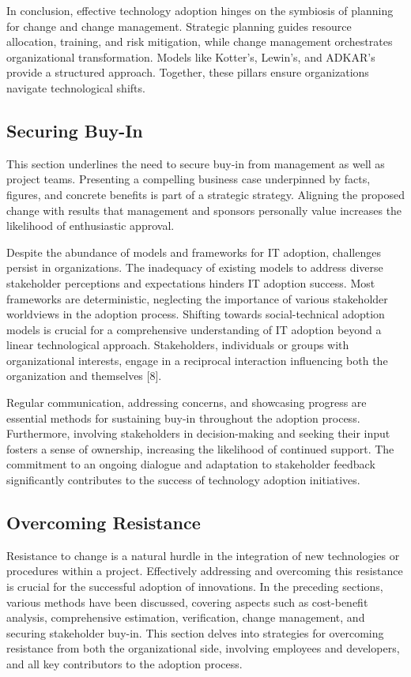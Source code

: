 \documentclass{article}
\begin{document}
\noindent In conclusion, effective technology adoption hinges on the symbiosis of planning for change and change management. Strategic planning guides resource allocation, training, and risk mitigation, while change management orchestrates organizational transformation. Models like Kotter's, Lewin's, and ADKAR's provide a structured approach. Together, these pillars ensure organizations navigate technological shifts.

\subsection{Securing Buy-In}
This section underlines the need to secure buy-in from management as well as project teams. Presenting a compelling business case underpinned by facts, figures, and concrete benefits is part of a strategic strategy. Aligning the proposed change with results that management and sponsors personally value increases the likelihood of enthusiastic approval. \newline

\noindent Despite the abundance of models and frameworks for IT adoption, challenges persist in organizations. The inadequacy of existing models to address diverse stakeholder perceptions and expectations hinders IT adoption success. Most frameworks are deterministic, neglecting the importance of various stakeholder worldviews in the adoption process. Shifting towards social-technical adoption models is crucial for a comprehensive understanding of IT adoption beyond a linear technological approach. Stakeholders, individuals or groups with organizational interests, engage in a reciprocal interaction influencing both the organization and themselves [8]. \newline

\noindent Regular communication, addressing concerns, and showcasing progress are essential methods for sustaining buy-in throughout the adoption process. Furthermore, involving stakeholders in decision-making and seeking their input fosters a sense of ownership, increasing the likelihood of continued support. The commitment to an ongoing dialogue and adaptation to stakeholder feedback significantly contributes to the success of technology adoption initiatives.



\subsection{Overcoming Resistance}
Resistance to change is a natural hurdle in the integration of new technologies or procedures within a project. Effectively addressing and overcoming this resistance is crucial for the successful adoption of innovations. In the preceding sections, various methods have been discussed, covering aspects such as cost-benefit analysis, comprehensive estimation, verification, change management, and securing stakeholder buy-in. This section delves into strategies for overcoming resistance from both the organizational side, involving employees and developers, and all key contributors to the adoption process.\newline
\end{document}

